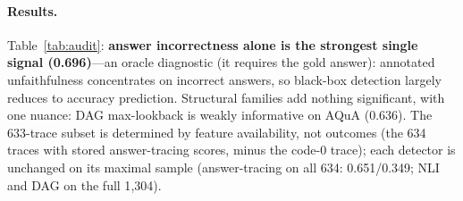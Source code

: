 \documentclass[11pt]{article}
\begin{document}
\begin{table}[t]
\centering
\small
{}
\caption{Black-box signals vs.\ the human label ($n{=}633$ complete-feature traces: 4 domains $\times$ the 2 open models bearing stored answer-tracing scores). \emph{In}correctness dominates; answer-tracing helps only inverted (prefix-instability intended direction: 0.374); structure adds nothing. Targeted interventions (v2 harness): $g{=}0.56$--$0.61$, dominated by answer-tracing (not shown).}
\label{tab:audit}
\end{table}

\paragraph{Results.} Table~\ref{tab:audit}: \textbf{answer incorrectness alone is the strongest single signal (0.696)}---an oracle diagnostic (it requires the gold answer): annotated unfaithfulness concentrates on incorrect answers, so black-box detection largely reduces to accuracy prediction. Structural families add nothing significant, with one nuance: DAG max-lookback is weakly informative on AQuA (0.636). The 633-trace subset is determined by feature availability, not outcomes (the 634 traces with stored answer-tracing scores, minus the code-0 trace); each detector is unchanged on its maximal sample (answer-tracing on all 634: 0.651/0.349; NLI and DAG on the full 1{,}304).
\end{document}
